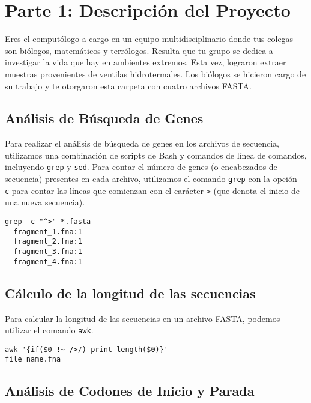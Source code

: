 \section*{Parte 1: Descripción del Proyecto} %
\label{sec:parte1} %
Eres el computólogo a cargo en un equipo multidisciplinario donde tus colegas son biólogos, matemáticos y terrólogos. Resulta que tu grupo se dedica a investigar la vida que hay en ambientes extremos. Esta vez, lograron extraer muestras provenientes de ventilas hidrotermales. Los biólogos se hicieron cargo de su trabajo y te otorgaron esta carpeta con cuatro archivos FASTA.

\subsection*{Análisis de Búsqueda de Genes}

Para realizar el análisis de búsqueda de genes en los archivos de secuencia, utilizamos una combinación de scripts de Bash y comandos de línea de comandos, incluyendo \texttt{grep} y \texttt{sed}. Para contar el número de genes (o encabezados de secuencia) presentes en cada archivo, utilizamos el comando \texttt{grep} con la opción \texttt{-c} para contar las líneas que comienzan con el carácter \texttt{>} (que denota el inicio de una nueva secuencia).

\begin{verbatim}
grep -c "^>" *.fasta
  fragment_1.fna:1
  fragment_2.fna:1
  fragment_3.fna:1
  fragment_4.fna:1
\end{verbatim}

\subsection*{Cálculo de la longitud de las secuencias}

Para calcular la longitud de las secuencias en un archivo FASTA, podemos utilizar el comando \texttt{awk}. 

\begin{verbatim}
awk '{if($0 !~ />/) print length($0)}' 
file_name.fna
\end{verbatim}

\subsection*{Análisis de Codones de Inicio y Parada}


